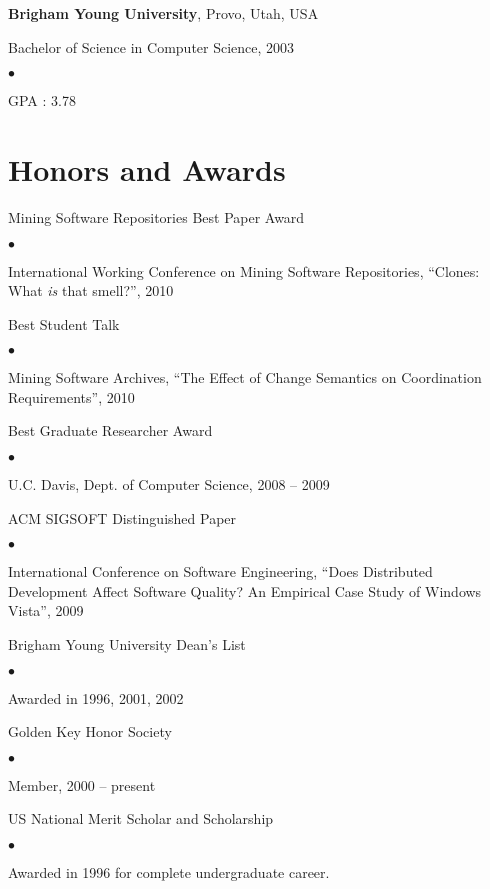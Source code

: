 \documentclass[margin,line,article,letterpaper]{res}
\newenvironment{list1}{
  \begin{list}{}{%
      \setlength{\itemsep}{0in}
      \setlength{\parsep}{0in} \setlength{\parskip}{0in}
      \setlength{\topsep}{0in} \setlength{\partopsep}{0in} 
      \setlength{\leftmargin}{0.17in}}}{\end{list}}
\newenvironment{list2}{
  \begin{list}{$\bullet$}{%
      \setlength{\itemsep}{0in}
      \setlength{\parsep}{0in} \setlength{\parskip}{0in}
      \setlength{\topsep}{0in} \setlength{\partopsep}{0in} 
      \setlength{\leftmargin}{0.2in}}}{\end{list}}
\begin{document}
\begin{resume}
\textbf{Brigham Young University}, Provo, Utah, USA
\begin{list1}
\item Bachelor of Science in Computer Science, 2003
\begin{list2}
\vspace*{.05in}
\item GPA : 3.78
\end{list2}
\end{list1}


\section{Honors and Awards} 

Mining Software Repositories Best Paper Award
\begin{list2}
\item International Working Conference on Mining Software Repositories, ``Clones: What \emph{is} that smell?'', 2010
\end{list2}

Best Student Talk
\begin{list2}
\item Mining Software Archives, ``The Effect of Change Semantics on Coordination Requirements'', 2010
\end{list2}

Best Graduate Researcher Award
\begin{list2}
\item U.C. Davis, Dept. of Computer Science, 2008 -- 2009
\end{list2}

ACM SIGSOFT Distinguished Paper
\begin{list2}
\item International Conference on Software Engineering, ``Does Distributed Development
Affect Software Quality?  An Empirical Case Study of Windows Vista'', 2009
\end{list2}

Brigham Young University Dean's List
\begin{list2}
\item Awarded in 1996, 2001, 2002
\end{list2}

Golden Key Honor Society
\begin{list2}
\item Member, 2000 -- present
\end{list2}

US National Merit Scholar and Scholarship
\begin{list2}
\item Awarded in 1996 for complete undergraduate career.
\end{list2}


\end{resume}
\end{document}
